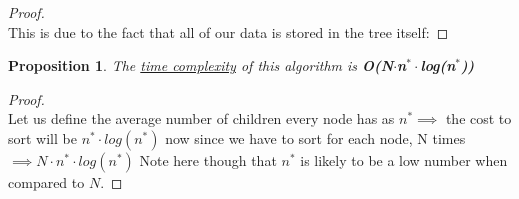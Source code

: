 \documentclass[12pt]{article}
\newtheorem{proposition}[theorem]{Proposition}
\begin{document}
\begin{proof}
~ \\ \indent This is due to the fact that all of our data is stored in the tree itself:
\end{proof}

\begin{proposition}
\label{numq}
The \underline{time complexity} of this algorithm is \textbf{O(N$\cdot$n$^{\ast}\cdot$log(n$^{\ast}$))}
\end{proposition}

\begin{proof}
~ \\ \indent Let us define the average number of children every node has as $n^{\ast} \implies$ the
cost to sort will be $n^{\ast}\cdot log(n^{\ast})$ now since we have to sort for each node, N times
$\implies N\cdot n^{\ast}\cdot log(n^{\ast})$ Note here though that $n^{\ast}$ is likely to be a low
number when compared to $N$.
\end{proof}



\end{document}
